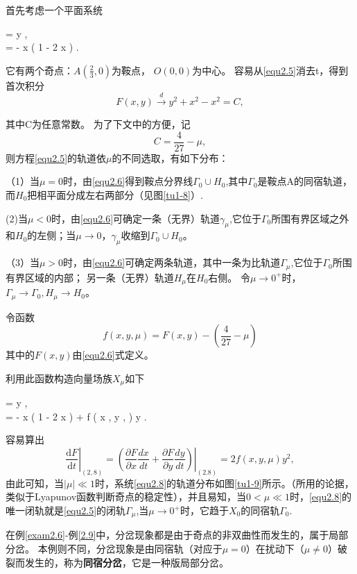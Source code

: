 \begin{example}[DL]
  首先考虑一个平面系统
\begin{ode}
\label{equ2.5}
\dxdt= y , \\
\dydt= - x \left( 1 -  { 2 } x \right)  .
\end{ode}
  它有两个奇点：$A \left( \frac { 2 } { 3 } , 0 \right)$为鞍点，  $O ( 0,0 )$为中心。
  容易从\ref{equ2.5}消去t，得到首次积分
  \begin{equation}
    F ( x , y ) \stackrel { d } { \longrightarrow } y ^ { 2 } + x ^ { 2 } - x ^ { 2 } = C,
    \label{equ2.6}
  \end{equation}
  
  
  其中C为任意常数。
  为了下文中的方便，记
  \begin{equation}
    C = \frac { 4 } { 27 } - \mu,
    \label{equ2.7}
  \end{equation}
  则方程\ref{equ2.5}的轨道依\(\mu\)的不同选取，有如下分布：


  （1）当\(\mu=0\)时，由\ref{equ2.6}得到鞍点分界线$\Gamma _ { 0 } \cup H _ {  0  }$,其中\(\Gamma_0\)是鞍点A的同宿轨道，而\(H_0\)把相平面分成左右两部分（见图\ref{tu1-8}）.


  (2)当$\mu < 0$时，由\ref{equ2.6}可确定一条（无界）轨道\(\gamma_\mu\),它位于\(\Gamma_0\)所围有界区域之外和\(H_0\)的左侧；当$\mu \rightarrow 0$，\(\gamma_\mu\)收缩到$\Gamma_ { 0 } \cup H _ { 0 }$。


（3）当$\mu > 0$时，由\ref{equ2.6}可确定两条轨道，其中一条为比轨道\(
  \Gamma_\mu \),它位于\(\Gamma_0\)所围有界区域的内部；
  另一条（无界）轨道\(H_\mu\)在\(H_0\)右侧。
  令$\mu \rightarrow 0 ^ { + }$时，$\Gamma _ { \mu } \rightarrow \Gamma _ { 0 } , H _ { \mu } \rightarrow H _ { 0 }$。

  令函数
  \[f ( x , y , \mu ) = F ( x , y ) - \left( \frac { 4 } { 27 } - \mu \right)\]
  其中的$F ( x , y )$由\ref{equ2.6}式定义。
  
  利用此函数构造向量场族$X _ { \mu }$如下
\begin{ode}
\dxdt= y , \\
\dydt= - x \left( 1 -  { 2 } x \right) + f ( x , y , \mu ) y .
\label{equ2.8}
\end{ode}
  容易算出
  \[
  \left. \frac { \mathrm { d } F } { \mathrm { d } t } \right| _ { ( 2,8 ) }
    = \left. \left( \frac { \partial F } { \partial x } \frac { d x } { d t } + \frac { \partial F } { \partial y } \frac { d y } { d t } \right) \right| _ { ( 2.8 ) }
    = 2 f ( x , y , \mu ) y ^ { 2 },
    \]
  由此可知，当$| \mu | \ll 1$时，系统\ref{equ2.8}的轨道分布如图\ref{tu1-9}所示。（所用的论据，类似于Lyapunov函数判断奇点的稳定性），并且易知，当$0 < \mu \ll 1$时，\ref{equ2.8}的唯一闭轨就是\ref{equ2.5}的闭轨\(\Gamma_\mu\),当$\mu \rightarrow 0 ^ { + }$时，它趋于\(X_0\)的同宿轨\(\Gamma_0\).
\end{example}
在例\ref{exam2.6}-例\ref{2.9}中，分岔现象都是由于奇点的非双曲性而发生的，属于局部分岔。
本例则不同，分岔现象是由同宿轨（对应于\(\mu=0\)）在扰动下（\(\mu \neq 0\)）破裂而发生的，称为\textbf{同宿分岔}，它是一种版局部分岔。


